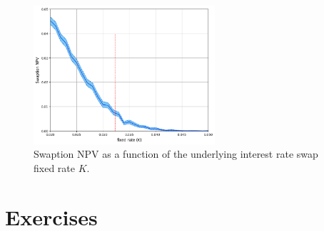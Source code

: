 \begin{figure}[htb]
\centering
\includegraphics[width=0.6\textwidth]{figures/swaption_npv_vs_K}
\caption{Swaption NPV as a function of the underlying interest rate swap fixed rate $K$.}
\label{fig:swaption_npv_vs_K}
\end{figure}

\section*{Exercises}

